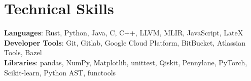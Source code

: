 \documentclass[letterpaper,11pt]{article}
\begin{document}
\section{Technical Skills}
 \begin{itemize}[leftmargin=0.15in, label={}]
    \small{\item{
     \textbf{Languages}{: Rust, Python, Java, C, C++, LLVM, MLIR, JavaScript, LateX} \\
     \textbf{Developer Tools}{: Git, Gitlab, Google Cloud Platform, BitBucket, Atlassian Tools, Bazel} \\
     \textbf{Libraries}{: pandas, NumPy, Matplotlib, unittest, Qiskit, Pennylane, PyTorch, Scikit-learn, Python AST, functools}
    }}
 \end{itemize}
 


\end{document}
